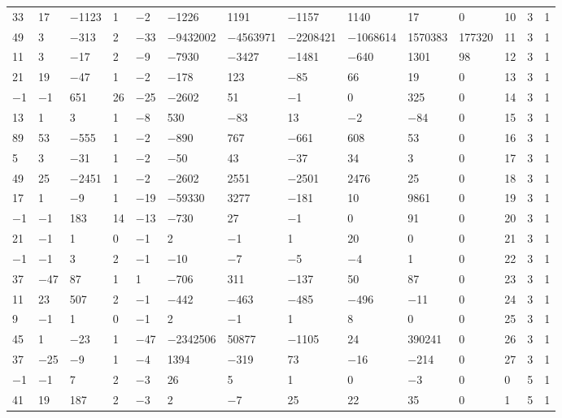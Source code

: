 \documentclass[10pt,a4paper]{amsart}
\numberwithin{equation}{section}
\theoremstyle{definition}
\numberwithin{table}{section}
\begin{document}
{\begin{paracol}{3}
\begin{supertabular}{|w{c}{.32cm}w{c}{.32cm}w{c}{.32cm}@{\hspace{.5cm}}w{c}{.2cm}w{c}{.2cm}|@{\hspace{\tabcolsep}}HHHHHHw{c}{.17cm}w{c}{.17cm}w{c}{.17cm}|}
			33 & 17 & $-$1123 & 1 & $-$2 & $-$1226 & 1191 & $-$1157 & 1140 & 17 & 0 & 10 & 3 & 1 \\
			49 & 3 & $-$313 & 2 & $-$33 & $-$9432002 & $-$4563971 & $-$2208421 & $-$1068614 & 1570383 & 177320 & 11 & 3 & 1 \\
			11 & 3 & $-$17 & 2 & $-$9 & $-$7930 & $-$3427 & $-$1481 & $-$640 & 1301 & 98 & 12 & 3 & 1 \\
			21 & 19 & $-$47 & 1 & $-$2 & $-$178 & 123 & $-$85 & 66 & 19 & 0 & 13 & 3 & 1 \\
			$-$1 & $-$1 & 651 & 26 & $-$25 & $-$2602 & 51 & $-$1 & 0 & 325 & 0 & 14 & 3 & 1 \\
			13 & 1 & 3 & 1 & $-$8 & 530 & $-$83 & 13 & $-$2 & $-$84 & 0 & 15 & 3 & 1 \\
			89 & 53 & $-$555 & 1 & $-$2 & $-$890 & 767 & $-$661 & 608 & 53 & 0 & 16 & 3 & 1 \\
			5 & 3 & $-$31 & 1 & $-$2 & $-$50 & 43 & $-$37 & 34 & 3 & 0 & 17 & 3 & 1 \\
			49 & 25 & $-$2451 & 1 & $-$2 & $-$2602 & 2551 & $-$2501 & 2476 & 25 & 0 & 18 & 3 & 1 \\
			17 & 1 & $-$9 & 1 & $-$19 & $-$59330 & 3277 & $-$181 & 10 & 9861 & 0 & 19 & 3 & 1 \\
			$-$1 & $-$1 & 183 & 14 & $-$13 & $-$730 & 27 & $-$1 & 0 & 91 & 0 & 20 & 3 & 1 \\
			21 & $-$1 & 1 & 0 & $-$1 & 2 & $-$1 & 1 & 20 & 0 & 0 & 21 & 3 & 1 \\
			$-$1 & $-$1 & 3 & 2 & $-$1 & $-$10 & $-$7 & $-$5 & $-$4 & 1 & 0 & 22 & 3 & 1 \\
			37 & $-$47 & 87 & 1 & 1 & $-$706 & 311 & $-$137 & 50 & 87 & 0 & 23 & 3 & 1 \\
			11 & 23 & 507 & 2 & $-$1 & $-$442 & $-$463 & $-$485 & $-$496 & $-$11 & 0 & 24 & 3 & 1 \\
			9 & $-$1 & 1 & 0 & $-$1 & 2 & $-$1 & 1 & 8 & 0 & 0 & 25 & 3 & 1 \\
			45 & 1 & $-$23 & 1 & $-$47 & $-$2342506 & 50877 & $-$1105 & 24 & 390241 & 0 & 26 & 3 & 1 \\
			37 & $-$25 & $-$9 & 1 & $-$4 & 1394 & $-$319 & 73 & $-$16 & $-$214 & 0 & 27 & 3 & 1 \\
			$-$1 & $-$1 & 7 & 2 & $-$3 & 26 & 5 & 1 & 0 & $-$3 & 0 & 0 & 5 & 1\\
			41 & 19 & 187 & 2 & $-$3 & 2 & $-$7 & 25 & 22 & 35 & 0 & 1 & 5 & 1 \\

\end{supertabular}
\end{paracol}}
\end{document}
